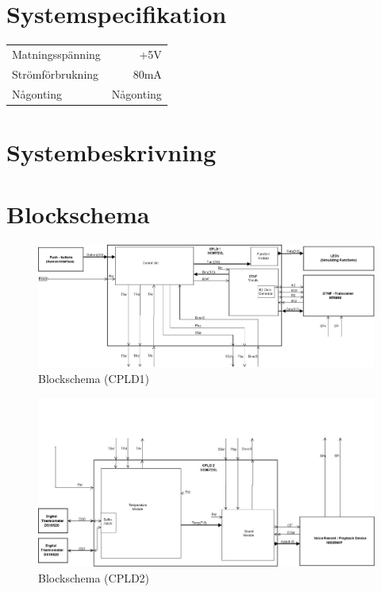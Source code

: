 \documentclass[a4paper,11pt]{article}
\begin{document}
\section{Systemspecifikation}

	\begin{tabular}{ l r}
	   Matningsspänning & +5V\\
	   Strömförbrukning & ~80mA\\
	   Någonting & Någonting\\
	\end{tabular}

\section{Systembeskrivning}

\section{Blockschema}

	\begin{figure}[h!]
	  \centering
	      \includegraphics[scale=0.48, angle=90]{BlockDiagramCPLD1.jpg}
	  	\caption{Blockschema (CPLD1)}
	\end{figure}

	\begin{figure}[h!]
	  \centering
	      \includegraphics[scale=0.48, angle=90]{BlockDiagramCPLD2.jpg}
	  	\caption{Blockschema (CPLD2)}
	\end{figure}
\end{document}

